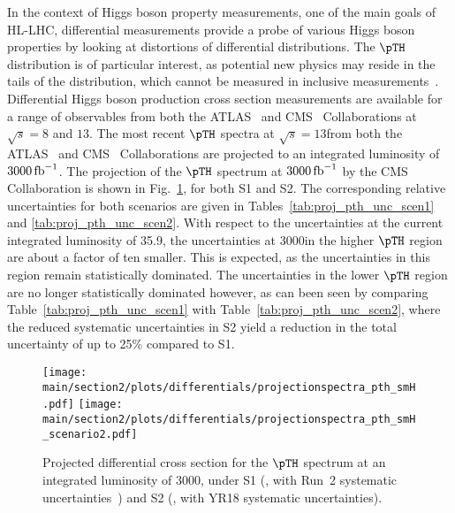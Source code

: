 In the context of Higgs boson property measurements, one of the main goals of HL-LHC, differential measurements provide a probe of various Higgs boson properties by looking at distortions of differential distributions.
% 
The $\pTH$ distribution is of particular interest, as potential new physics may reside in the tails of the distribution, which cannot be measured in inclusive measurements~\cite{%
Khachatryan:2016vau,%
Aad:2015zhl,%
CMS:2018lkl%
}.
% 
Differential Higgs boson production cross section measurements are available for a range of observables from both the ATLAS~\cite{%
Aad:2014lwa,%
Aad:2014tca,%
Aad:2016lvc,%
Aaboud:2018xdt,%
Aaboud:2017oem,%
Aaboud:2018ezd%
} and CMS~\cite{%
Khachatryan:2015rxa,%
Khachatryan:2015yvw,%
Khachatryan:2016vnn,%
Sirunyan:2018kta,%
CMS_AN_2016-442,%
CMS-PAS-HIG-17-028%
} Collaborations at $\sqrt{s}=8$ and $13$\TeV.
% 
The most recent $\pTH$ spectra at $\sqrt{s}=13$\TeV from both the ATLAS~\cite{Aaboud:2018ezd} and CMS~\cite{CMS-PAS-HIG-17-028} Collaborations are projected to an integrated luminosity of $3000\mbox{\ensuremath{\,\text{fb}^\text{$-$1}}}$.
% 
The projection of the $\pTH$ spectrum at $3000\mbox{\ensuremath{\,\text{fb}^\text{$-$1}}}$ by the CMS Collaboration is shown in Fig.~\ref{fig:proj_pth}, for both S1 and S2.
% 
The corresponding relative uncertainties for both scenarios are given in Tables~\ref{tab:proj_pth_unc_scen1} and \ref{tab:proj_pth_unc_scen2}.
% 
With respect to the uncertainties at the current integrated luminosity of 35.9\fbinv, the uncertainties at 3000\fbinv in the higher $\pTH$ region are about a factor of ten smaller. This is expected, as the uncertainties in this region remain statistically dominated.
% 
The uncertainties in the lower $\pTH$ region are no longer statistically dominated however, as can been seen by comparing Table~\ref{tab:proj_pth_unc_scen1} with Table~\ref{tab:proj_pth_unc_scen2}, where the reduced systematic uncertainties in S2 yield a reduction in the total uncertainty of up to 25\% compared to S1.


\begin{figure}[hbtp]
  \begin{center}
    \texttt{[image: \\main/section2/plots/differentials/projectionspectra\_pth\_smH.pdf]}
    \texttt{[image: \\main/section2/plots/differentials/projectionspectra\_pth\_smH\_scenario2.pdf]}
    \caption{
        Projected differential cross section for the $\pTH$ spectrum at an integrated luminosity of 3000\fbinv, under S1 (\cmsLeft, with Run~2 systematic uncertainties~\cite{CMS-PAS-HIG-17-028}) and S2 (\cmsRight, with YR18 systematic uncertainties).
        }
    \label{fig:proj_pth}
  \end{center}
\end{figure}

